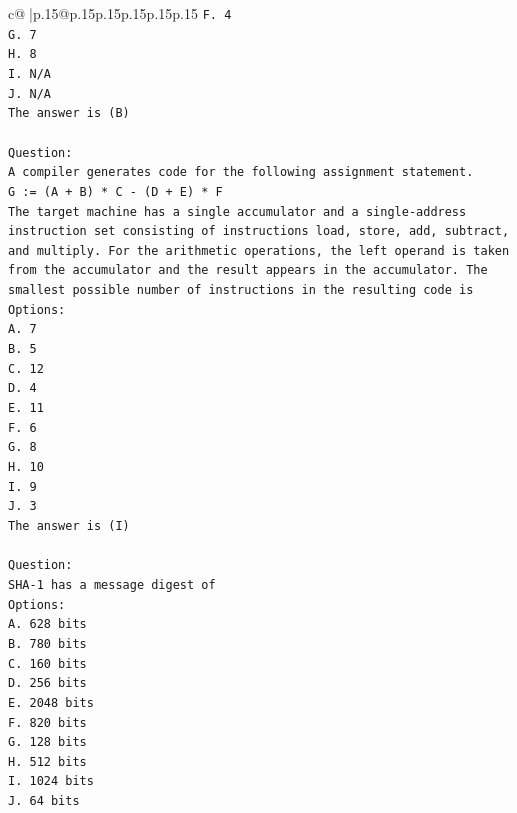 \documentclass{article}
\begin{document}
{\begin{supertabular}{c@{$\;$}|p{.15\linewidth}@{}p{.15\linewidth}p{.15\linewidth}p{.15\linewidth}p{.15\linewidth}p{.15\linewidth}}
{{{\texttt{F. 4} \\
\texttt{G. 7} \\
\texttt{H. 8} \\
\texttt{I. N/A} \\
\texttt{J. N/A} \\
\texttt{The answer is (B)} \\
\\ 
\texttt{Question:} \\
\texttt{A compiler generates code for the following assignment statement.} \\
\texttt{G := (A + B) * C {-} (D + E) * F} \\
\texttt{The target machine has a single accumulator and a single{-}address instruction set consisting of instructions load, store, add, subtract, and multiply. For the arithmetic operations, the left operand is taken from the accumulator and the result appears in the accumulator. The smallest possible number of instructions in the resulting code is} \\
\texttt{Options:} \\
\texttt{A. 7} \\
\texttt{B. 5} \\
\texttt{C. 12} \\
\texttt{D. 4} \\
\texttt{E. 11} \\
\texttt{F. 6} \\
\texttt{G. 8} \\
\texttt{H. 10} \\
\texttt{I. 9} \\
\texttt{J. 3} \\
\texttt{The answer is (I)} \\
\\ 
\texttt{Question:} \\
\texttt{SHA{-}1 has a message digest of} \\
\texttt{Options:} \\
\texttt{A. 628 bits} \\
\texttt{B. 780 bits} \\
\texttt{C. 160 bits} \\
\texttt{D. 256 bits} \\
\texttt{E. 2048 bits} \\
\texttt{F. 820 bits} \\
\texttt{G. 128 bits} \\
\texttt{H. 512 bits} \\
\texttt{I. 1024 bits} \\
\texttt{J. 64 bits} \\
}}}
\end{supertabular}}
\end{document}
